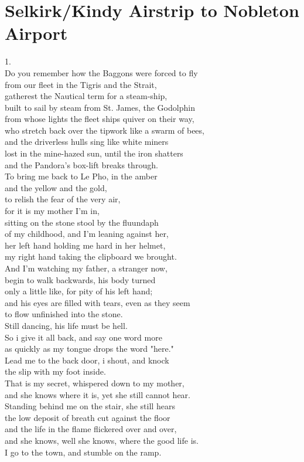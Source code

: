 \documentclass[smalldemyvopaper,11pt,twoside,onecolumn,openright,extrafontsizes]{memoir}
\newlength\drop
\begin{document}
\chapter{Selkirk/Kindy Airstrip to Nobleton Airport}
1.
\\Do you remember how the Baggons were forced to fly
\\from our fleet in the Tigris and the Strait,
\\gatherest the Nautical term for a steam-ship,
\\built to sail by steam from St. James, the Godolphin
\\from whose lights the fleet ships quiver on their way,
\\who stretch back over the tipwork like a swarm of bees,
\\and the driverless hulls sing like white miners
\\lost in the mine-hazed sun, until the iron shatters
\\and the Pandora's box-lift breaks through.
\\To bring me back to Le Pho, in the amber
\\and the yellow and the gold,
\\to relish the fear of the very air,
\\for it is my mother I'm in,
\\sitting on the stone stool by the fluundaph
\\of my childhood, and I'm leaning against her,
\\her left hand holding me hard in her helmet,
\\my right hand taking the clipboard we brought.
\\And I'm watching my father, a stranger now,
\\begin to walk backwards, his body turned
\\only a little like, for pity of his left hand;
\\and his eyes are filled with tears, even as they seem
\\to flow unfinished into the stone.
\\Still dancing, his life must be hell.
\\So i give it all back, and say one word more
\\as quickly as my tongue drops the word "here."
\\Lead me to the back door, i shout, and knock
\\the slip with my foot inside.
\\That is my secret, whispered down to my mother,
\\and she knows where it is, yet she still cannot hear.
\\Standing behind me on the stair, she still hears
\\the low deposit of breath cut against the floor
\\and the life in the flame flickered over and over,
\\and she knows, well she knows, where the good life is.
\\I go to the town, and stumble on the ramp.
\end{document}
